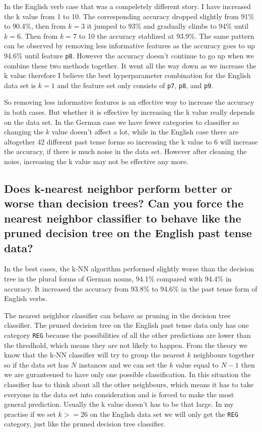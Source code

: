 \documentclass[11pt]{article} %
\begin{document}
In the English verb case that was a compeletely different story. I have increased the k value from 1 to 10. The corresponding accuracy dropped slightly from 91\% to 90.4\%, then from $k=3$ it jumped to 93\% and gradually climbs to 94\% until $k=6$. Then from $k=7$ to 10 the accuracy stablized at 93.9\%. The same pattern can be observed by removing less informative features as the accuracy goes to up 94.6\% until feature \verb|p8|. However the accuracy doesn't continue to go up when we combine these two methods together. It went all the way down as we increase the k value therefore I believe the best hyperparameter combination for the English data set is $k=1$ and the feature set only consists of \verb|p7|, \verb|p8|, and \verb|p9|.

So removing less informative features is an effective way to increase the accuracy in both cases. But whether it is effective by increasing the k value really depends on the data set. In the German case we have fewer categories to classifier so changing the $k$ value doesn't affect a lot, while in the English case there are altogether 42 different past tense forms so increasing the k value to 6 will increase the accuracy, if there is much noise in the data set. However after cleaning the noise, increasing the k value may not be effective any more.

\subsection{Does k-nearest neighbor perform better or worse than decision trees? Can you force the nearest neighbor classifier to behave like the pruned decision tree on the English past tense data?}

In the best cases, the k-NN algorithm performed slightly worse than the decision tree in the plural forms of German nouns, 94.1\% compared with 94.4\% in accuracy. It increased the accuracy from 93.8\% to 94.6\% in the past tense form of English verbs.

The nearest neighbor classifier can behave as pruning in the decision tree classifier. The pruned decision tree on the English past tense data only has one category \verb|REG| because the possibilities of all the other predictions are lower than the thredhold, which means they are not likely to happen. From the theory we know that the k-NN classifier will try to group the nearest $k$ neighbours together so if the data set has $N$ instances and we can set the $k$ value equal to $N-1$ then we are guranteened to have only one possible classification. In this situation the classifier has to think about all the other neighbours, which means it has to take everyone in the data set into consideration and is forced to make the most general prediction. Usually the k value doesn't has to be that large. In my practise if we set $k>=26$ on the English data set we will only get the \verb|REG| category, just like the pruned decision tree classifier.
\end{document}
